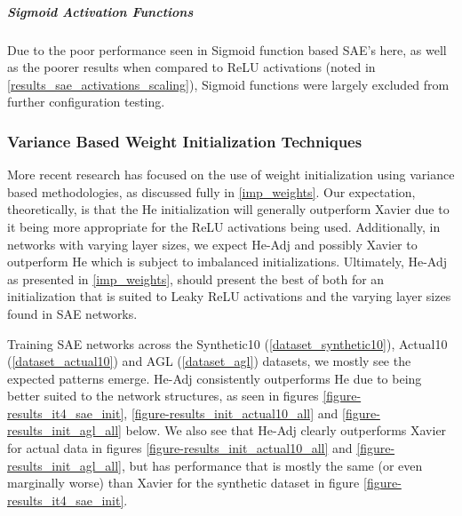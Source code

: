 \documentclass[a4paper,11pt,oneside]{article}
\theoremstyle{plain}
\theoremstyle{definition}
\begin{document}
\subparagraph{Sigmoid Activation Functions} 
Due to the poor performance seen in Sigmoid function based SAE's here, as well as the poorer results when compared to ReLU activations (noted in \ref{results_sae_activations_scaling}), Sigmoid functions were largely excluded from further configuration testing.


\subsubsection{Variance Based Weight Initialization Techniques}

More recent research has focused on the use of weight initialization using variance based methodologies, as discussed fully in \ref{imp_weights}. Our expectation, theoretically, is that the He initialization will generally outperform Xavier due to it being more appropriate for the ReLU activations being used. Additionally, in networks with varying layer sizes, we expect He-Adj and possibly Xavier to outperform He which is subject to imbalanced initializations. Ultimately, He-Adj as presented in \ref{imp_weights}, should present the best of both for an initialization that is suited to Leaky ReLU activations and the varying layer sizes found in SAE networks.\newline

Training SAE networks across the Synthetic10 (\ref{dataset_synthetic10}), Actual10 (\ref{dataset_actual10}) and AGL (\ref{dataset_agl}) datasets, we mostly see the expected patterns emerge. He-Adj consistently outperforms He due to being better suited to the network structures, as seen in figures \ref{figure-results_it4_sae_init}, \ref{figure-results_init_actual10_all} and \ref{figure-results_init_agl_all} below. We also see that He-Adj clearly outperforms Xavier for actual data in figures \ref{figure-results_init_actual10_all} and \ref{figure-results_init_agl_all}, but has performance that is mostly the same (or even marginally worse) than Xavier for the synthetic dataset in figure \ref{figure-results_it4_sae_init}. \newline
\end{document}
